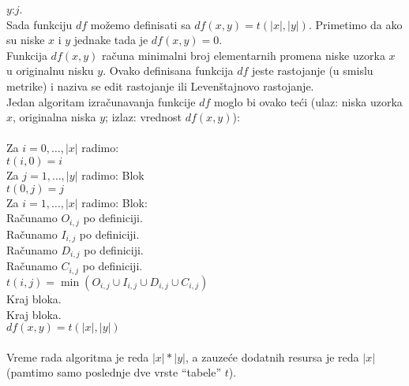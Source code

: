     $y$:$j$.\\
    Sada funkciju $df$ mo\v{z}emo definisati sa $df(x,y)=t(|x|,|y|)$.
    Primetimo da ako su niske $x$ i $y$ jednake tada je $df(x,y)=0$.\\
    Funkcija $df(x,y)$ ra\v{c}una minimalni broj elementarnih promena niske
    uzorka $x$ u originalnu nisku $y$.
    Ovako definisana funkcija $df$ jeste rastojanje (u smislu metrike)
    i naziva se edit rastojanje ili Leven\v{s}tajnovo rastojanje.
    \\
    Jedan algoritam izra\v{c}unavanja funkcije $df$ moglo bi ovako te\'ci
    (ulaz: niska uzorka $x$, originalna niska $y$; izlaz: vrednost
    $df(x,y)$):\\
    \\
    \hs Za $i=0, \ldots, |x|$ radimo:\\
    \hs\hs$t(i,0)=i$\\
    \hs Za $j=1, \ldots, |y|$ radimo: Blok\\
    \hs\hs$t(0,j)=j$\\
    \hs\hs Za $i=1, \ldots, |x|$ radimo: Blok:\\
    \hs\hs\hs Ra\v{c}unamo $O_{i,j}$ po definiciji.\\
    \hs\hs\hs Ra\v{c}unamo $I_{i,j}$ po definiciji.\\
    \hs\hs\hs Ra\v{c}unamo $D_{i,j}$ po definiciji.\\
    \hs\hs\hs Ra\v{c}unamo $C_{i,j}$ po definiciji.\\
    \hs\hs\hs$t(i,j)=\min(O_{i,j}\cup I_{i,j}\cup D_{i,j}\cup C_{i,j})$\\
    \hs\hs Kraj bloka.\\
    \hs Kraj bloka.\\
    \hs$df(x,y)=t(|x|,|y|)$\\
    \\
    Vreme rada algoritma je reda $|x|*|y|$, a zauze\'ce dodatnih resursa je
    reda $|x|$ (pamtimo samo poslednje dve vrste ``tabele'' $t$).
%
%
